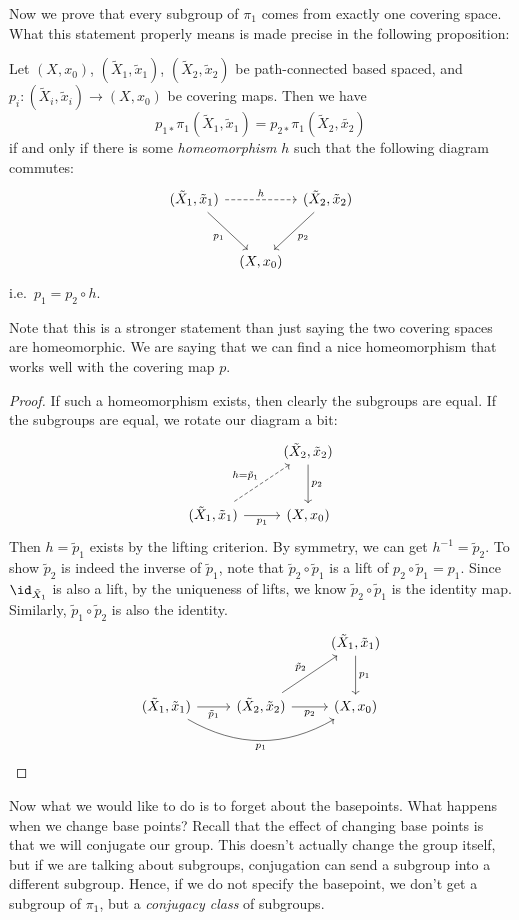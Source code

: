 \documentclass[a4paper]{article}
\begin{document}
Now we prove that every subgroup of $\pi_1$ comes from exactly one covering space. What this statement properly means is made precise in the following proposition:
\begin{prop}
  Let $(X, x_0)$, $(\tilde{X}_1, \tilde{x}_1)$, $(\tilde{X}_2, \tilde{x}_2)$ be path-connected based spaced, and $p_i: (\tilde{X}_i, \tilde{x}_i) \to (X, x_0)$ be covering maps. Then we have
  \[
    p_{1*}\pi_1(\tilde{X}_1, \tilde{x}_1) = p_{2*} \pi_1(\tilde{X}_2, \tilde{x_2})
  \]
  if and only if there is some \emph{homeomorphism} $h$ such that the following diagram commutes:
  \[
    \begin{tikzcd}[row sep=large, column sep=tiny]
      (\tilde{X}_1, \tilde{x}_1) \ar[rr, dashed, "h"] \ar[rd, "p_1"'] & & (\tilde{X}_2, \tilde{x}_2) \ar[ld, "p_2"]\\
      & (X, x_0)
    \end{tikzcd}
  \]
  i.e.\ $p_1 = p_2 \circ h$.
\end{prop}
Note that this is a stronger statement than just saying the two covering spaces are homeomorphic. We are saying that we can find a nice homeomorphism that works well with the covering map $p$.

\begin{proof}
  If such a homeomorphism exists, then clearly the subgroups are equal. If the subgroups are equal, we rotate our diagram a bit:
  \[
    \begin{tikzcd}[row sep=large]
      & (\tilde{X}_2, \tilde{x}_2) \ar[d, "p_2"]\\
      (\tilde{X}_1, \tilde{x}_1) \ar [r, "p_1"'] \ar [ru, dashed, "h = \tilde{p}_1"] & (X, x_0)
    \end{tikzcd}
  \]
  Then $h = \tilde{p}_1$ exists by the lifting criterion. By symmetry, we can get $h^{-1} = \tilde{p}_2$. To show $\tilde{p}_2$ is indeed the inverse of $\tilde{p}_1$, note that $\tilde{p}_2 \circ \tilde{p}_1$ is a lift of $p_2 \circ \tilde{p}_1 = p_1$. Since $\id_{\tilde{X}_1}$ is also a lift, by the uniqueness of lifts, we know $\tilde{p}_2 \circ \tilde{p}_1$ is the identity map. Similarly, $\tilde{p}_1 \circ \tilde{p}_2$ is also the identity.
  \[
    \begin{tikzcd}[row sep=large]
      & & (\tilde{X}_1, \tilde{x}_1) \ar[d, "p_1"]\\
      (\tilde{X}_1, \tilde{x}_1) \ar[rr, bend right, "p_1"'] \ar [r, "\tilde{p}_1"'] & (\tilde{X}_2, \tilde{x}_2) \ar [ru, "\tilde{p}_2"] \ar[r, "p_2"'] & (X, x_0)
    \end{tikzcd}%
  \]
\end{proof}
Now what we would like to do is to forget about the basepoints. What happens when we change base points? Recall that the effect of changing base points is that we will conjugate our group. This doesn't actually change the group itself, but if we are talking about subgroups, conjugation can send a subgroup into a different subgroup. Hence, if we do not specify the basepoint, we don't get a subgroup of $\pi_1$, but a \emph{conjugacy class} of subgroups.
\end{document}
